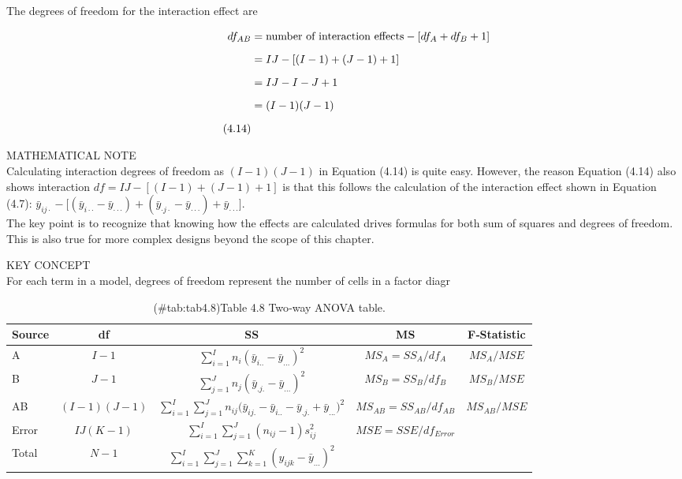 \documentclass[
]{report}
\theoremstyle{definition}
\theoremstyle{definition}
\theoremstyle{definition}
\theoremstyle{definition}
\theoremstyle{remark}
\begin{document}
The degrees of freedom for the interaction effect are

\begin{align}
df_{AB} \notag
  &= \text{number of interaction effects} - [df_A + df_B + 1] \\[6pt] \notag
  &= IJ - [(I - 1) + (J - 1) + 1] \\[6pt] \notag
  &= IJ - I - J + 1 \\[6pt] \notag
  &= (I - 1)(J - 1) \\[6pt] \tag{4.14}
\end{align}

MATHEMATICAL NOTE\\
Calculating interaction degrees of freedom as \((I - 1)(J - 1)\) in Equation (4.14) is quite easy. However, the reason Equation (4.14) also shows interaction \(df = IJ - [(I - 1) + (J - 1) + 1]\) is that this follows the calculation of the interaction effect shown in Equation (4.7): \(\bar y_{ij\cdot} - \bigl[(\bar y_{i\cdot\cdot} - \bar y_{\cdot\cdot\cdot}) + (\bar y_{\cdot j \cdot} - \bar y_{\cdot\cdot\cdot})+ \bar y_{\cdot\cdot\cdot}\bigr].\)\\
The key point is to recognize that knowing how the effects are calculated drives formulas for both sum of squares and degrees of freedom. This is also true for more complex designs beyond the scope of this chapter.

KEY CONCEPT\\
For each term in a model, degrees of freedom represent the number of cells in a factor diagr

\begin{table}[!h]
\centering
\caption{(\#tab:tab4.8)Table 4.8 Two‐way ANOVA table.}
\centering
\begin{tabular}[t]{lcccc}
\toprule
Source & df & SS & MS & F‐Statistic\\
\midrule
A & $I - 1$ & $\sum_{i=1}^I n_i (\bar y_{i..} - \bar y_{...})^2$ & $MS_A = SS_A / df_A$ & $MS_A/ MSE$\\
B & $J - 1$ & $\sum_{j=1}^J n_j (\bar y_{.j.} - \bar y_{...})^2$ & $MS_B = SS_B / df_B$ & $MS_B/ MSE$\\
AB & $(I-1)(J-1)$ & $\displaystyle \sum_{i=1}^I \sum_{j=1}^J n_{ij}\bigl(\bar y_{ij.} - \bar y_{i..} - \bar y_{.j.} + \bar y_{...}\bigr)^2$ & $MS_{AB} = SS_{AB} / df_{AB}$ & $MS_{AB}/ MSE$\\
Error & $IJ(K-1)$ & $\displaystyle \sum_{i=1}^I \sum_{j=1}^J (n_{ij}-1) s^2_{ij}$ & $MSE = SSE / df_{Error}$ & \\
Total & $N-1$ & $\displaystyle \sum_{i=1}^I \sum_{j=1}^J \sum_{k=1}^K (y_{ijk}-\bar y_{...})^2$ &  & \\
\bottomrule
\end{tabular}
\end{table}
\end{document}
